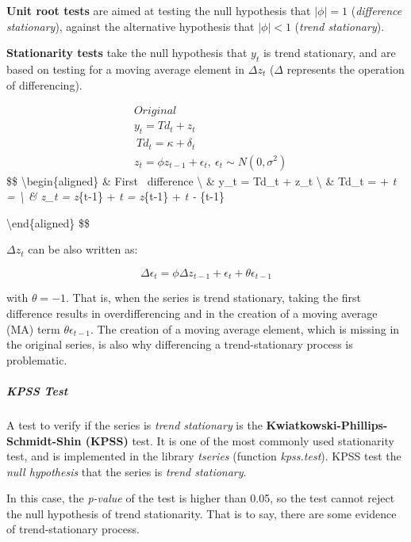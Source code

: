 \documentclass[
]{article}
\begin{document}
\textbf{Unit root tests} are aimed at testing the null hypothesis that \(|\phi| = 1\) (\emph{difference stationary}), against the alternative hypothesis that \(|\phi| < 1\) (\emph{trend stationary}).

\textbf{Stationarity tests} take the null hypothesis that \(y_t\) is trend stationary, and are based on testing for a moving average element in \(\Delta z_t\) (\(\Delta\) represents the operation of differencing).

\[
\begin{aligned} 
& Original \\
& y_t = Td_t + z_t  \\
& \ Td_t = \kappa + \delta_t \\
& z_t = \phi z_{t-1} + \epsilon_t, \ \epsilon_t \sim N(0, \sigma^2) 
\end{aligned} 
\]
\$\$
\textbackslash begin\{aligned\}
\& First ~difference \textbackslash{}
\& \Delta y\_t = \Delta Td\_t + \Delta z\_t \textbackslash{}
\& \Delta Td\_t = \Delta \kappa + \Delta \delta\emph{t = \delta \textbackslash{}
\& \Delta z\_t = \phi \Delta z}\{t-1\} + \Delta \epsilon\emph{t = \phi \Delta z}\{t-1\} + \epsilon\emph{t - \epsilon}\{t-1\}

\textbackslash end\{aligned\}
\$\$

\(\Delta z_t\) can be also written as:

\[
\Delta \epsilon_t = \phi \Delta z_{t-1} + \epsilon_t + \theta \epsilon_{t-1}
\]

with \(\theta = -1\). That is, when the series is trend stationary, taking the first difference results in overdifferencing and in the creation of a moving average (MA) term \(\theta \epsilon_{t-1}\). The creation of a moving average element, which is missing in the original series, is also why differencing a trend-stationary process is problematic.

\hypertarget{kpss-test}{%
\subparagraph{KPSS Test}\label{kpss-test}}

A test to verify if the series is \emph{trend stationary} is the \textbf{Kwiatkowski-Phillips-Schmidt-Shin (KPSS)} test. It is one of the most commonly used stationarity test, and is implemented in the library \emph{tseries} (function \emph{kpss.test}). KPSS test the \emph{null hypothesis} that the series is \emph{trend stationary}.

In this case, the \emph{p-value} of the test is higher than 0.05, so the test cannot reject the null hypothesis of trend stationarity. That is to say, there are some evidence of trend-stationary process.
\end{document}
